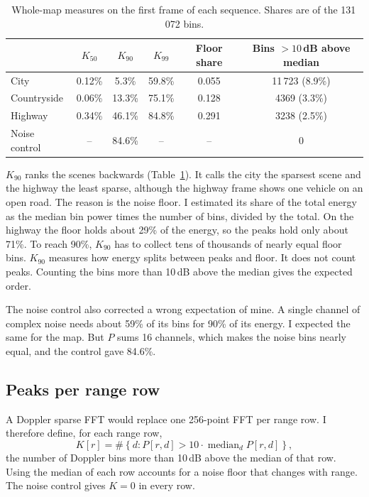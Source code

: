\documentclass[10pt,a4paper]{article}
\begin{document}
\begin{table}[h]
\caption{Whole-map measures on the first frame of each sequence. Shares are of the 131\,072 bins.}
\label{tab:k90}
\centering
\begin{tabular}{lccccc}
\toprule
 & $K_{50}$ & $K_{90}$ & $K_{99}$ & Floor share & Bins $>10$\,dB above median \\
\midrule
City & 0.12\% & 5.3\% & 59.8\% & 0.055 & 11\,723 (8.9\%) \\
Countryside & 0.06\% & 13.3\% & 75.1\% & 0.128 & 4369 (3.3\%) \\
Highway & 0.34\% & 46.1\% & 84.8\% & 0.291 & 3238 (2.5\%) \\
Noise control & -- & 84.6\% & -- & -- & 0 \\
\bottomrule
\end{tabular}
\end{table}

$K_{90}$ ranks the scenes backwards (Table~\ref{tab:k90}). It calls the city the sparsest scene and the highway the least sparse, although the highway frame shows one vehicle on an open road. The reason is the noise floor. I estimated its share of the total energy as the median bin power times the number of bins, divided by the total. On the highway the floor holds about 29\% of the energy, so the peaks hold only about 71\%. To reach 90\%, $K_{90}$ has to collect tens of thousands of nearly equal floor bins. $K_{90}$ measures how energy splits between peaks and floor. It does not count peaks. Counting the bins more than 10\,dB above the median gives the expected order.

The noise control also corrected a wrong expectation of mine. A single channel of complex noise needs about 59\% of its bins for 90\% of its energy. I expected the same for the map. But $P$ sums 16 channels, which makes the noise bins nearly equal, and the control gave 84.6\%.

\subsection{Peaks per range row}
A Doppler sparse FFT would replace one 256-point FFT per range row. I therefore define, for each range row,
\begin{equation}
K[r] = \#\left\{ d : P[r,d] > 10 \cdot \operatorname{median}_d P[r,d] \right\},
\label{eq:k}
\end{equation}
the number of Doppler bins more than 10\,dB above the median of that row. Using the median of each row accounts for a noise floor that changes with range. The noise control gives $K = 0$ in every row.
\end{document}
